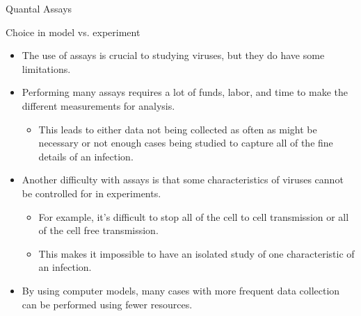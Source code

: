 \documentclass{beamer}
\begin{document}
\begin{frame}{Quantal Assays}


\end{frame}

\begin{frame}{Choice in model vs. experiment}

    \begin{itemize}
        \item The use of assays is crucial to studying viruses, but they do have some limitations. 
        \item Performing many assays requires a lot of funds, labor, and time to make the different measurements for analysis. 
        \begin{itemize}
            \item This leads to either data not being collected as often as might be necessary or not enough cases being studied to capture all of the fine details of an infection. 
        \end{itemize}
        \item Another difficulty with assays is that some characteristics of viruses cannot be controlled for in experiments. 
        \begin{itemize}
            \item For example, it's difficult to stop all of the cell to cell transmission or all of the cell free transmission. 
            \item This makes it impossible to have an isolated study of one characteristic of an infection. 
        \end{itemize}
        \item By using computer models, many cases with more frequent data collection can be performed using fewer resources.
    \end{itemize}

\end{frame}
\end{document}

